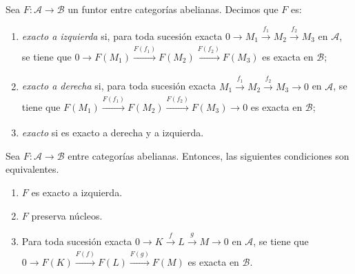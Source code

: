 \documentclass[tesis]{subfiles}
\begin{document}
\begin{Def}\label{Def: Funtores exactos a izquierda y a derecha}
    Sea $F:\mathscr{A}\to \mathscr{B}$ un funtor entre categorías abelianas. Decimos que $F$ es:

    \begin{enumerate}[label=(\alph*)]
    
        \item \emph{exacto a izquierda} si, para toda sucesión exacta $0\to M_1\xrightarrow[]{f_1} M_2\xrightarrow[]{f_2} M_3$ en $\mathscr{A}$, se tiene que $0\to F(M_1)\xrightarrow[]{F(f_1)} F(M_2)\xrightarrow[]{F(f_2)} F(M_3)$ es exacta en $\mathscr{B}$;

        \item \emph{exacto a derecha} si, para toda sucesión exacta $M_1\xrightarrow[]{f_1} M_2\xrightarrow[]{f_2} M_3\to 0$ en $\mathscr{A}$, se tiene que $F(M_1)\xrightarrow[]{F(f_1)} F(M_2)\xrightarrow[]{F(f_2)} F(M_3)\to 0$ es exacta en $\mathscr{B}$;

        \item \emph{exacto} si es exacto a derecha y a izquierda.
    \end{enumerate}
\end{Def}

\begin{Teo}\label{Mendoza-1.10.3}
     Sea $F:\mathscr{A}\to \mathscr{B}$ entre categorías abelianas. Entonces, las siguientes condiciones son equivalentes.

    \begin{enumerate}[label=(\alph*)]
    
        \item $F$ es exacto a izquierda.

        \item $F$ preserva núcleos.

        \item Para toda sucesión exacta $0\to K\xrightarrow[]{f} L\xrightarrow[]{g} M\to 0$ en $\mathscr{A}$, se tiene que $0\to F(K)\xrightarrow[]{F(f)} F(L)\xrightarrow[]{F(g)} F(M)$ es exacta en $\mathscr{B}$.
    \end{enumerate}
\end{Teo}
\end{document}
